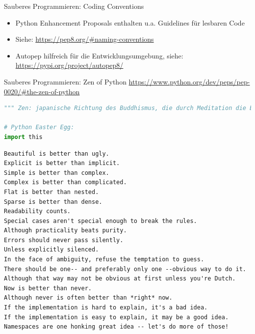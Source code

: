 \begin{frame}[fragile]{Sauberes Programmieren: Coding Conventions}
    \begin{itemize}
        \item Python Enhancement Proposals enthalten u.a. Guidelines für lesbaren Code
        \item Siehe: \url{https://pep8.org/#naming-conventions}
        \item Autopep hilfreich für die Entwicklungsumgebung, siehe:  \url{https://pypi.org/project/autopep8/}
     \end{itemize}
\end{frame}



\begin{frame}[fragile]{Sauberes Programmieren: Zen of Python}
\url{https://www.python.org/dev/peps/pep-0020/#the-zen-of-python} 
\begin{lstlisting}[language=Python]
""" Zen: japanische Richtung des Buddhismus, die durch Meditation die Erfahrung der Einheit allen Seins und damit tätige Lebenskraft und größte Selbstbeherrschung zu erreichen sucht. """

# Python Easter Egg:
import this
\end{lstlisting}
\begin{lstlisting}	
Beautiful is better than ugly.
Explicit is better than implicit.
Simple is better than complex.
Complex is better than complicated.
Flat is better than nested.
Sparse is better than dense.
Readability counts.
Special cases aren't special enough to break the rules.
Although practicality beats purity.
Errors should never pass silently.
Unless explicitly silenced.
In the face of ambiguity, refuse the temptation to guess.
There should be one-- and preferably only one --obvious way to do it.
Although that way may not be obvious at first unless you're Dutch.
Now is better than never.
Although never is often better than *right* now.
If the implementation is hard to explain, it's a bad idea.
If the implementation is easy to explain, it may be a good idea.
Namespaces are one honking great idea -- let's do more of those!
\end{lstlisting}
\end{frame}


